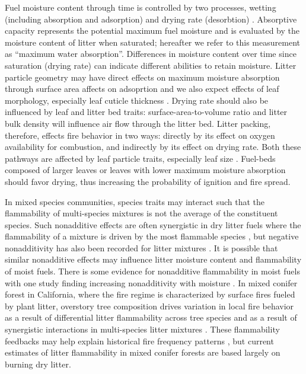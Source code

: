 \documentclass[letterpaper,12pt]{article}
\begin{document}
Fuel moisture content through time is controlled by two processes, wetting
(including absorption and adsorption) and drying rate (desorbtion)
\citep{Anderson-1990, Kreye+Kobziar+etal-2013}. Absorptive capacity represents
the potential maximum fuel moisture and is evaluated by the moisture content of
litter when saturated; hereafter we refer to this measurement as ``maximum
water absorption''. Differences in moisture content over time since saturation
(drying rate) can indicate different abilities to retain moisture. Litter
particle geometry may have direct effects on maximum moisture absorption
through surface area affects on adsoprtion and we also expect effects of leaf
morphology, especially leaf cuticle thickness \citep{Van_Wagner-1969}. Drying
rate should also be influenced by leaf and litter bed traits:
surface-area-to-volume ratio and litter bulk density will influence air flow
through the litter bed. Litter packing, therefore, effects fire behavior in two
ways: directly by its effect on oxygen availability for combustion, and
indirectly by its effect on drying rate. Both these pathways are affected by
leaf particle traits, especially leaf size \citep{Scarff+Westoby-2006}.
Fuel-beds composed of larger leaves or leaves with lower maximum moisture
absorption should favor drying, thus increasing the probability of ignition and
fire spread.

In mixed species communities, species traits may interact such that the
flammability of multi-species mixtures is not the average of the constituent
species. Such nonadditive effects are often synergistic in dry litter fuels
where the flammability of a mixture is driven by the most flammable species
\citep{VanAltena+Logtestjin+etal-2012, Magalhaes+Schwilk-2012}, but negative
nonadditivity has also been recorded for litter mixtures
\citep{Blauw+Wensink+etal-2015, Zhao+vanLogtestijn+etal-2019}. It is possible
that similar nonadditive effects may influence litter moisture content and
flammability of moist fuels. There is some evidence for nonadditive
flammability in moist fuels with one study finding increasing nonadditivity
with moisture \citep{Blauw+Wensink+etal-2015}. In mixed conifer forest in
California, where the fire regime is characterized by surface fires fueled by
plant litter, overstory tree composition drives variation in local fire
behavior \citep{Schwilk+Caprio-2011} as a result of differential litter
flammability across tree species and as a result of synergistic interactions in
multi-species litter mixtures \citep{Magalhaes+Schwilk-2012}. These
flammability feedbacks may help explain historical fire frequency patterns
\citep{Schwilk+Caprio-2011}, but current estimates of litter flammability in
mixed conifer forests are based largely on burning dry litter.
\end{document}
